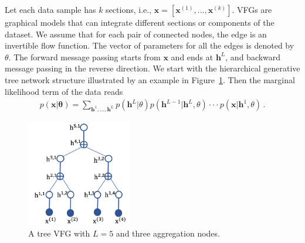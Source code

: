\documentclass[twoside]{article}
\begin{document}
Let each data sample has $k$ sections, i.e., $\mathbf{x} = [\mathbf{x}^{(1)}, ..., \mathbf{x}^{(k)}]$. VFGs are graphical models that can integrate different sections or components of the dataset.  We assume that for each pair of connected nodes, the edge is an invertible flow function. 
The vector of parameters for all the edges is denoted by $\theta$. 
The forward message passing starts from $\mathbf{x}$ and ends at $\mathbf{h}^L$, and backward message passing in the reverse direction. We start with the hierarchical generative tree network structure illustrated by an example in Figure~\ref{fig:tree_vfg}. 
Then the marginal likelihood term of the data reads
\begin{align*}
p(\mathbf{x}| \mathbf{\theta}) = \sum_{\mathbf{h}^1, ..., \mathbf{h}^L} p(\mathbf{h}^L | \theta)p(\mathbf{h}^{L-1} | \mathbf{h}^{L},\theta) \cdot \cdot  \cdot  p(\mathbf{x} | \mathbf{h}^{1}, \theta) \, .
\end{align*}

\begin{figure}[H]
    \centering
    \includegraphics[width=1.8in]{fig/tree_vfg.png}
    \caption{A  tree VFG with $L=5$ and three aggregation nodes.}
    \label{fig:tree_vfg}
\end{figure}
\end{document}
